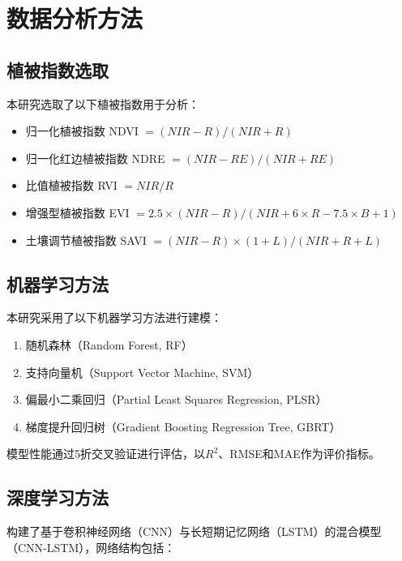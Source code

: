 \section{数据分析方法}
\label{sec:analysis}

\subsection{植被指数选取}
\label{subsec:vi_selection}

本研究选取了以下植被指数用于分析：

\begin{itemize}[itemsep=0pt,parsep=0pt]
  \item 归一化植被指数 NDVI $= (NIR - R) / (NIR + R)$
  \item 归一化红边植被指数 NDRE $= (NIR - RE) / (NIR + RE)$
  \item 比值植被指数 RVI $= NIR / R$
  \item 增强型植被指数 EVI $= 2.5 \times (NIR - R) / (NIR + 6 \times R - 7.5 \times B + 1)$
  \item 土壤调节植被指数 SAVI $= (NIR - R) \times (1 + L) / (NIR + R + L)$
\end{itemize}

\subsection{机器学习方法}
\label{subsec:ml}

本研究采用了以下机器学习方法进行建模：

\begin{enumerate}[itemsep=0pt,parsep=0pt]
  \item 随机森林（Random Forest, RF）
  \item 支持向量机（Support Vector Machine, SVM）
  \item 偏最小二乘回归（Partial Least Squares Regression, PLSR）
  \item 梯度提升回归树（Gradient Boosting Regression Tree, GBRT）
\end{enumerate}

模型性能通过5折交叉验证进行评估，以$R^2$、RMSE和MAE作为评价指标。

\subsection{深度学习方法}
\label{subsec:dl_method}

构建了基于卷积神经网络（CNN）与长短期记忆网络（LSTM）的混合模型（CNN-LSTM），网络结构包括：

